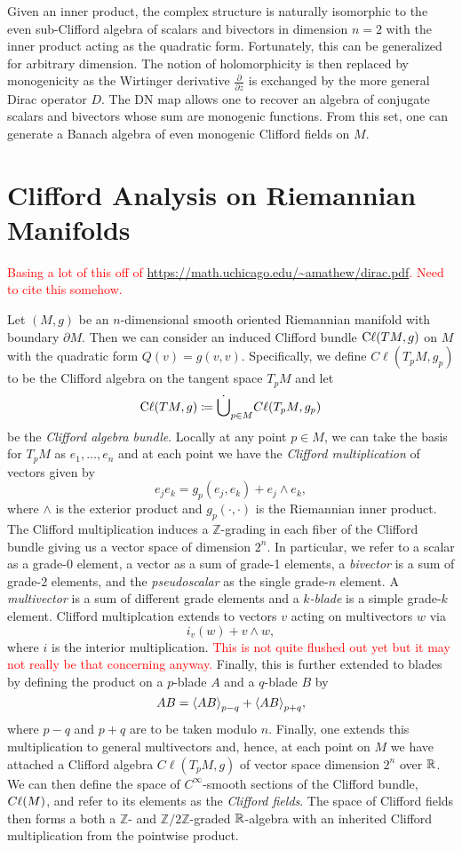\documentclass[12pt]{article}
\begin{document}
Given an inner product, the complex structure is naturally isomorphic to the even sub-Clifford algebra of scalars and bivectors in dimension $n=2$ with the inner product acting as the quadratic form.  Fortunately, this can be generalized for arbitrary dimension.  The notion of holomorphicity is then replaced by monogenicity as the Wirtinger derivative $\frac{\partial}{\partial \overline{z}}$ is exchanged by the more general Dirac operator $D$.  The DN map allows one to recover an algebra of conjugate scalars and bivectors whose sum are monogenic functions. From this set, one can generate a Banach algebra of even monogenic Clifford fields on $M$.


\section{Clifford Analysis on Riemannian Manifolds}

\textcolor{red}{Basing a lot of this off of \url{https://math.uchicago.edu/~amathew/dirac.pdf}. Need to cite this somehow.}

Let $(M,g)$ be an $n$-dimensional smooth oriented Riemannian manifold with boundary $\partial M$.  Then we can consider an induced Clifford bundle $\mathrm{C}\ell(TM, g)$ on $M$ with the quadratic form $Q(v)=g(v,v)$.  Specifically, we define $C\ell(T_pM,g_p)$ to be the Clifford algebra on the tangent space $T_pM$ and let
\[
\mathrm{C}\ell(TM, g) \coloneqq \dot{\bigcup}_{p\in M} C\ell (T_pM,g_p)
\]
be the \emph{Clifford algebra bundle}. Locally at any point $p\in M$, we can take the basis for $T_pM$ as $e_1, \dots, e_n$ and at each point we have the \emph{Clifford multiplication} of vectors given by 
\[
e_j e_k = g_p(e_j,e_k) + e_j \wedge e_k, 
\]
where $\wedge$ is the exterior product and $g_p(\cdot,\cdot)$ is the Riemannian inner product. The Clifford multiplication induces a $\mathbb{Z}$-grading in each fiber of the Clifford bundle giving us a vector space of dimension $2^n$.  In particular, we refer to a scalar as a grade-0 element, a vector as a sum of grade-1 elements, a \emph{bivector} is a sum of grade-2 elements, and the \emph{pseudoscalar} as the single grade-$n$ element. A \emph{multivector} is a sum of different grade elements and a \emph{$k$-blade} is a simple grade-$k$ element. Clifford multiplcation extends to vectors $v$ acting on multivectors $w$ via
\[
i_v(w)+v\wedge w,
\] 
where $i$ is the interior multiplication. \textcolor{red}{This is not quite flushed out yet but it may not really be that concerning anyway.} Finally, this is further extended to blades by defining the product on a $p$-blade $A$ and a $q$-blade $B$ by
\[
AB = \proj{p-q}{AB} + \proj{p+q}{AB},
\]
where $p-q$ and $p+q$ are to be taken modulo $n$. Finally, one extends this multiplication to general multivectors and, hence, at each point on $M$ we have attached a Clifford algebra $C \ell (T_pM,g)$ of vector space dimension $2^n$ over $\mathbb{R}$.  We can then define the space of $C^\infty$-smooth sections of the Clifford bundle, $C\ell(M)$, and refer to its elements as the \emph{Clifford fields}. The space of Clifford fields then forms a both a $\mathbb{Z}$- and $\mathbb{Z}/2\mathbb{Z}$-graded $\mathbb{R}$-algebra with an inherited Clifford multiplication from the pointwise product.
\end{document}
